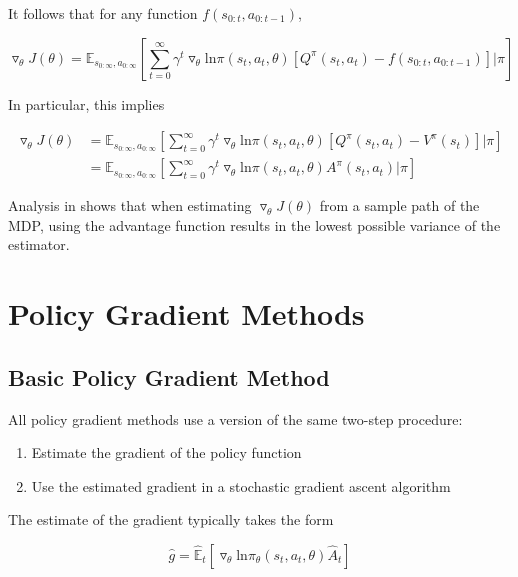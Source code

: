 \documentclass[11pt]{article}
\theoremstyle{definition}
\begin{document}
It follows that for any function $f(s_{0:t},a_{0:t-1})$,

\begin{equation}
\triangledown_{\theta}J(\theta) = \mathbb{E}_{s_{0:\infty},a_{0:\infty}} \left[ \sum_{t=0}^{\infty} \gamma^t \triangledown_{\theta} \mathrm{ln}\pi(s_t,a_t,\theta) \left[ Q^{\pi} (s_t,a_t) - f(s_{0:t},a_{0:t-1}) \right] | \pi \right]
\end{equation}

In particular, this implies

\begin{equation}
\begin{split}
\triangledown_{\theta}J(\theta) &= \mathbb{E}_{s_{0:\infty},a_{0:\infty}} \left[ \sum_{t=0}^{\infty} \gamma^t \triangledown_{\theta} \mathrm{ln}\pi(s_t,a_t,\theta) \left[ Q^{\pi} (s_t,a_t) - V^{\pi}(s_t) \right] | \pi \right] \\
&= \mathbb{E}_{s_{0:\infty},a_{0:\infty}} \left[ \sum_{t=0}^{\infty} \gamma^t \triangledown_{\theta} \mathrm{ln}\pi(s_t,a_t,\theta) A^{\pi} (s_t,a_t) | \pi \right]
\end{split}
\end{equation}

Analysis in \cite{greensmith2004} shows that when estimating $\triangledown_{\theta}J(\theta)$ from a sample path of the MDP, using the advantage function results in the lowest possible variance of the estimator.

\section{Policy Gradient Methods}

\subsection{Basic Policy Gradient Method}

All policy gradient methods use a version of the same two-step procedure:

\begin{enumerate}
\item{Estimate the gradient of the policy function}
\item{Use the estimated gradient in a stochastic gradient ascent algorithm}
\end{enumerate}

The estimate of the gradient typically takes the form

\begin{equation}
\hat{g} = \mathbb{\hat{E}}_t \left[ \triangledown_{\theta} \mathrm{ln} \pi_{\theta} \left(s_t, a_t, \theta \right) \hat{A}_t \right]
\end{equation}
\end{document}
